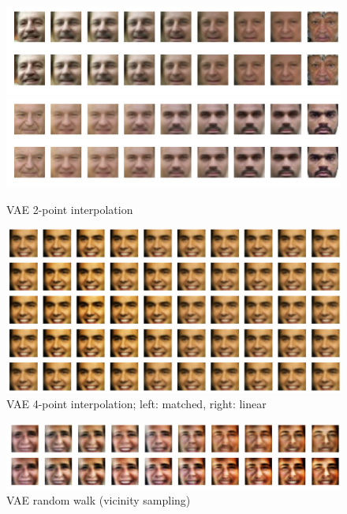\documentclass{article}
\begin{document}
\begin{center}
\begin{figure}
    \includegraphics[width=\linewidth]{report/vae_int2_1.png}
    \includegraphics[width=\linewidth]{report/vae_int2_2.png}
    \caption{VAE 2-point interpolation}
\end{figure}
\end{center}

\begin{center}
\begin{figure}
    \includegraphics[width=\linewidth]{report/vae_int4.png}
    \caption{VAE 4-point interpolation; left: matched, right: linear}
\end{figure}
\end{center}

\begin{center}
\begin{figure}
    \includegraphics[width=\linewidth]{report/vae_rw.png}
    \caption{VAE random walk (vicinity sampling)}
\end{figure}
\end{center}
\end{document}
